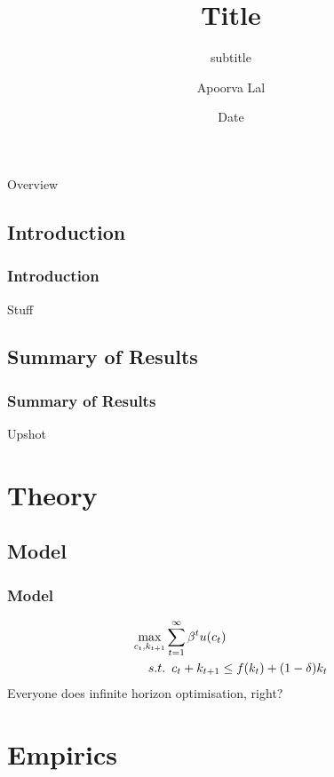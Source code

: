 \documentclass[11pt, aspectratio=169]{beamer}
\title{Title}
\subtitle{subtitle}
\author{Apoorva Lal}
\institute{Stanford}
\date{Date}
\begin{document}
\frame{\titlepage}

\begin{frame}{Overview}
\tableofcontents
\end{frame}

\subsection{Introduction}
\begin{frame}\frametitle{Introduction}
Stuff
\cite{angristMostlyHarmlessEconometrics2008}
\end{frame}
\subsection{Summary of Results}
\begin{frame}[t]\frametitle{Summary of Results}
Upshot
\end{frame}


\section{Theory}
\tableofcontents[currentsection,subsubsectionstyle=hide]
\subsection{Model}
\begin{frame}[t]\frametitle{Model}
\begin{align*}
\maximise_{c_t,k_{t+1}} &  \sum_{t=1}^{\infty} \beta^t u(c_t)  \\
  s.t. & \enspace c_{t} + k_{t+1} \leq f(k_t) + (1-\delta)k_t
\end{align*}
Everyone does infinite horizon optimisation, right?
\end{frame}
\section{Empirics}
\end{document}
